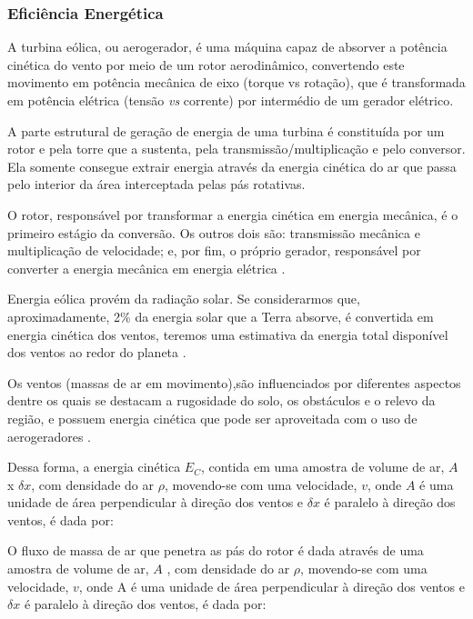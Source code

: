   \subsubsection{Eficiência Energética}
  
    A turbina eólica, ou aerogerador, é uma máquina capaz de absorver a potência cinética do vento por meio de um rotor
    aerodinâmico, convertendo este movimento em potência mecânica de eixo (torque vs rotação),  que é transformada em
    potência elétrica (tensão \textit{vs} corrente) por intermédio de um gerador elétrico.
    
    A parte estrutural de geração de energia de uma turbina é constituída por um rotor e pela torre que a sustenta,
    pela transmissão/multiplicação e pelo conversor. Ela somente consegue extrair energia através da energia cinética do 
    ar que passa pelo interior da área interceptada pelas pás rotativas.  
    
    O rotor, responsável por transformar a energia cinética em energia mecânica, é o primeiro estágio da conversão.
    Os outros dois são: transmissão mecânica e multiplicação de velocidade; e, por fim, o próprio gerador, responsável
    por converter a energia mecânica em energia elétrica \cite{amaral12}.
    
    Energia eólica provém da radiação solar. Se considerarmos que, aproximadamente, 2\% da energia solar que a Terra absorve,
    é convertida em energia cinética dos ventos, teremos uma estimativa da energia total disponível dos ventos ao redor
    do planeta \cite{terciote02}.
    
    Os ventos (massas de ar em movimento),são influenciados por diferentes aspectos dentre os quais se destacam a rugosidade
    do solo, os obstáculos e o relevo da região, e possuem energia cinética que pode ser aproveitada
    com o uso de aerogeradores \cite{terciote02}.
    
    Dessa forma, a energia cinética $E_C$, contida em uma amostra de volume de ar, $A$ x $\delta x$, com densidade do ar $\rho$, 
    movendo-se com uma velocidade, $v$,  onde $A$ é uma unidade de área perpendicular à direção dos ventos e $\delta x$ é paralelo 
    à direção dos  ventos, é dada por:
    
    O fluxo de massa de ar que penetra as pás do rotor é dada através de  uma amostra de volume de ar, $A$ , com densidade
    do ar $\rho$, movendo-se com uma velocidade, $v$, onde A é uma unidade de área perpendicular à direção dos ventos e $\delta x$
    é paralelo à direção dos  ventos, é dada por:
    
